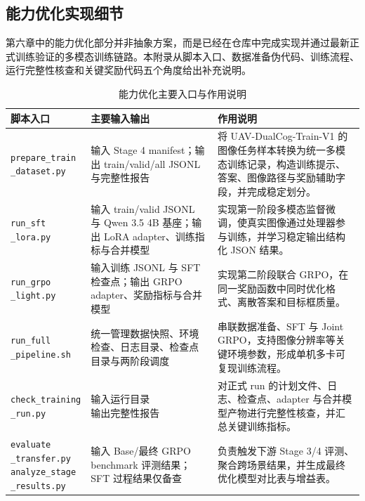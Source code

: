 \begin{thesisappendix}
\section{能力优化实现细节}
\label{app:optimization-entry}

第六章中的能力优化部分并非抽象方案，而是已经在仓库中完成实现并通过最新正式训练验证的多模态训练链路。本附录从脚本入口、数据准备伪代码、训练流程、运行完整性核查和关键奖励代码五个角度给出补充说明。

\begin{table}[htbp]
    \centering
    \caption{能力优化主要入口与作用说明}
    \label{tab:app-optimization-entry}
    \scriptsize
    \begin{tabularx}{\textwidth}{@{}p{2.6cm}p{4.1cm}X@{}}
        \toprule
        脚本入口 & 主要输入输出 & 作用说明 \\
        \midrule
        \makecell[l]{\texttt{prepare\_train}\\\texttt{\_dataset.py}} & 输入 Stage 4 manifest；输出 train/valid/all JSONL 与完整性报告 & 将 UAV-DualCog-Train-V1 的图像任务样本转换为统一多模态训练记录，构造训练提示、答案、图像路径与奖励辅助字段，并完成稳定划分。 \\
        \makecell[l]{\texttt{run\_sft}\\\texttt{\_lora.py}} & 输入 train/valid JSONL 与 Qwen 3.5 4B 基座；输出 LoRA adapter、训练指标与合并模型 & 实现第一阶段多模态监督微调，使真实图像通过处理器参与训练，并学习稳定输出结构化 JSON 结果。 \\
        \makecell[l]{\texttt{run\_grpo}\\\texttt{\_light.py}} & 输入训练 JSONL 与 SFT 检查点；输出 GRPO adapter、奖励指标与合并模型 & 实现第二阶段联合 GRPO，在同一奖励函数中同时优化格式、离散答案和目标框质量。 \\
        \makecell[l]{\texttt{run\_full}\\\texttt{\_pipeline.sh}} & 统一管理数据快照、环境检查、日志目录、检查点目录与两阶段调度 & 串联数据准备、SFT 与 Joint GRPO，支持图像分辨率等关键环境参数，形成单机多卡可复现训练流程。 \\
        \makecell[l]{\texttt{check\_training}\\\texttt{\_run.py}} & \makecell[l]{输入运行目录\\输出完整性报告} & 对正式 run 的计划文件、日志、检查点、adapter 与合并模型产物进行完整性核查，并汇总关键训练指标。 \\
        \makecell[l]{\texttt{evaluate}\\\texttt{\_transfer.py}\\\texttt{analyze\_stage}\\\texttt{\_results.py}} & \makecell[l]{输入 Base/最终 GRPO\\benchmark 评测结果；\\SFT 过程结果仅备查} & 负责触发下游 Stage 3/4 评测、聚合跨场景结果，并生成最终优化模型对比表与增益表。 \\
        \bottomrule
    \end{tabularx}
\end{table}


\end{thesisappendix}
